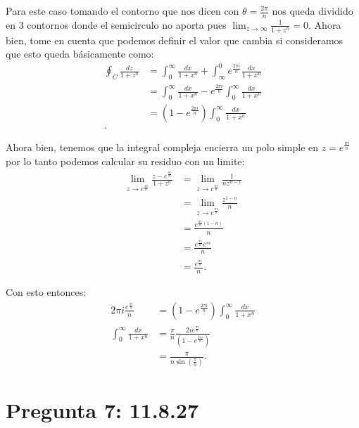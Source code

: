 \documentclass{report}
\begin{document}
Para este caso tomando el contorno que nos dicen con $\theta = \frac{2\pi}{n}$ nos queda dividido en 3 contornos donde el semicirculo no aporta pues $\lim_{z \to \infty} \frac{1}{1 + z^{n}} = 0$. Ahora bien, tome en cuenta que podemos definir el valor que cambia si consideramos que esto queda básicamente como:
\begin{align*}
  \oint_{C} \frac{dz}{1 + z^{n}} &= \int_0^{\infty} \frac{dx}{1 + x^{n}} + \int_{\infty}^{0}e^{\frac{2\pi i}{n}} \frac{dx}{1 + x^{n}}\\ 
  &=  \int_0^{\infty} \frac{dx}{1 + x^{n}} - e^{\frac{2\pi i}{n}}\int_{0}^{\infty} \frac{dx}{1 + x^{n}}\\
  &= \left( 1 - e^{\frac{2\pi i}{n}} \right) \int_{0}^{\infty} \frac{dx}{1 + x^{n}} \\
.\end{align*}

Ahora bien, tenemos que la integral compleja encierra un polo simple en $z = e^{\frac{\pi i}{n}}$ por lo tanto podemos calcular su residuo con un limite:
\begin{align*}
  \lim_{z \to e^{\frac{\pi i}{n}}} \frac{z - e^{\frac{\pi i}{n}}}{1 + z^{n}} &= \lim_{z \to e^{\frac{\pi i}{n}}} \frac{1}{nz^{n - 1}} \\
  &= \lim_{z \to e^{\frac{\pi i}{n}}} \frac{z^{1 - n}}{n}  \\
  &= \frac{e^{\frac{\pi i}{n}\left( 1 - n \right) }}{n} \\
  &= \frac{e^{\frac{\pi i}{n}}e^{\pi i}}{n} \\
  &= \frac{e^{\frac{\pi i}{n}}}{n}
.\end{align*}

Con esto entonces:
\begin{align*}
  2\pi i\frac{e^{\frac{\pi i}{n}}}{n}&= \left( 1 - e^{\frac{2\pi i}{n}} \right) \int_{0}^{\infty} \frac{dx}{1 + x^{n}} \\
  \int_{0}^{\infty} \frac{dx}{1 + x^{n}} &= \frac{\pi}{n}\frac{2i e^{\frac{\pi i}{n}}}{\left( 1 - e^{\frac{2\pi i}{n}} \right)} \\
  &= \frac{\pi}{n\sin\left( \frac{\pi}{n} \right) }
.\end{align*}

\chapter{Pregunta 7: 11.8.27}
\end{document}
